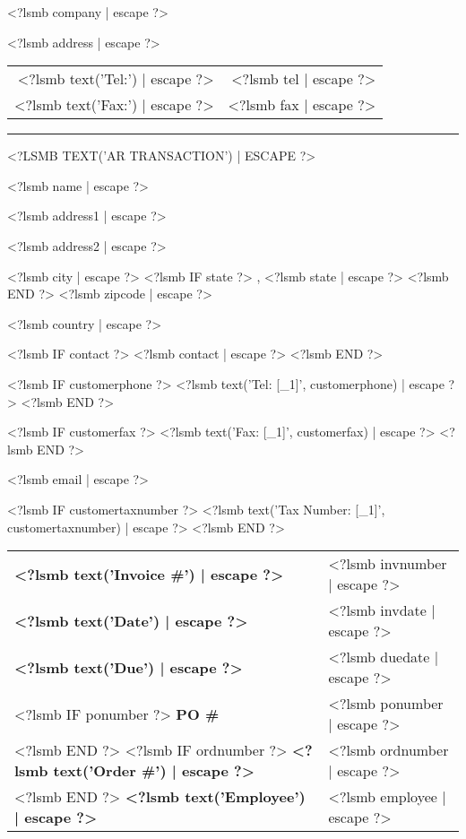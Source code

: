 \documentclass{scrartcl}
\begin{document}
\pagestyle{empty}

\fontsize{10pt}{12pt}\selectfont

\parbox{\textwidth}{%
  \parbox[b]{.42\textwidth}{%
    <?lsmb company | escape ?>
   
    <?lsmb address | escape ?>
  }
  \hfill
  \begin{tabular}[b]{rr@{}}
  <?lsmb text('Tel:') | escape ?> & <?lsmb tel | escape ?>\\
  <?lsmb text('Fax:') | escape ?> & <?lsmb fax | escape ?>
  \end{tabular}

  \rule[1.5em]{\textwidth}{0.5pt}
}

\centerline{\MakeUppercase{<?lsmb text('AR Transaction') | escape ?>}}

\vspace*{0.5cm}

\parbox[t]{.5\textwidth}{
<?lsmb name | escape ?>

<?lsmb address1 | escape ?>

<?lsmb address2 | escape ?>

<?lsmb city | escape ?>
<?lsmb IF state ?>
, <?lsmb state | escape ?>
<?lsmb END ?>
<?lsmb zipcode | escape ?>

<?lsmb country | escape ?>

\vspace{0.3cm}

<?lsmb IF contact ?>
<?lsmb contact | escape ?>
<?lsmb END ?>

\vspace{0.2cm}

<?lsmb IF customerphone ?>
<?lsmb text('Tel: [_1]', customerphone) | escape ?>
<?lsmb END ?>

<?lsmb IF customerfax ?>
<?lsmb text('Fax: [_1]', customerfax) | escape ?>
<?lsmb END ?>

<?lsmb email | escape ?>

<?lsmb IF customertaxnumber ?>
<?lsmb text('Tax Number: [_1]', customertaxnumber) | escape ?>
<?lsmb END ?>
}
\hfill
\begin{tabular}[t]{ll}
  \textbf{<?lsmb text('Invoice #') | escape ?>} & <?lsmb invnumber | escape ?> \\
  \textbf{<?lsmb text('Date') | escape ?>} & <?lsmb invdate | escape ?> \\
  \textbf{<?lsmb text('Due') | escape ?>} & <?lsmb duedate | escape ?> \\
  <?lsmb IF ponumber ?>
    \textbf{PO \#} & <?lsmb ponumber | escape ?> \\
  <?lsmb END ?>
  <?lsmb IF ordnumber ?>
    \textbf{<?lsmb text('Order #') | escape ?>} & <?lsmb ordnumber | escape ?> \\
  <?lsmb END ?>
  \textbf{<?lsmb text('Employee') | escape ?>} & <?lsmb employee | escape ?> \\
\end{tabular}
\end{document}
